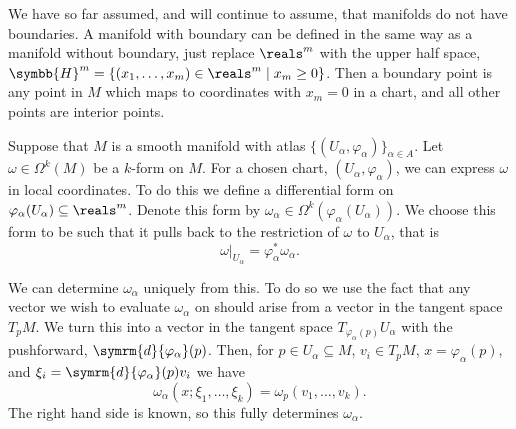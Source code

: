 \documentclass[fleqn]{NotesClass}
\renewcommand{\dl}{\symrm{d}}
\newcommand{\upperHalfSpace}{\symbb{H}}
\begin{document}
    \begin{remark}{}{}
        We have so far assumed, and will continue to assume, that manifolds do not have boundaries.
        A manifold with boundary can be defined in the same way as a manifold without boundary, just replace \(\reals^m\) with the upper half space, \(\upperHalfSpace^m = \{(x_1, \dotsc, x_m) \in \reals^m \mid x_m \ge 0\}\).
        Then a boundary point is any point in \(M\) which maps to coordinates with \(x_m = 0\) in a chart, and all other points are interior points.
    \end{remark}
    
    Suppose that \(M\) is a smooth manifold with atlas \(\{(U_\alpha, \varphi_\alpha)\}_{\alpha \in A}\).
    Let \(\omega \in \Omega^k(M)\) be a \(k\)-form on \(M\).
    For a chosen chart, \((U_\alpha, \varphi_\alpha)\), we can express \(\omega\) in local coordinates.
    To do this we define a differential form on \(\varphi_\alpha(U_\alpha) \subseteq \reals^m\).
    Denote this form by \(\omega_\alpha \in \Omega^k(\varphi_\alpha(U_\alpha))\).
    We choose this form to be such that it pulls back to the restriction of \(\omega\) to \(U_\alpha\), that is
    \begin{equation}
        \omega|_{U_\alpha} = \varphi_\alpha^*\omega_\alpha.
    \end{equation}
    
    We can determine \(\omega_\alpha\) uniquely from this.
    To do so we use the fact that any vector we wish to evaluate \(\omega_\alpha\) on should arise from a vector in the tangent space \(T_pM\).
    We turn this into a vector in the tangent space \(T_{\varphi_\alpha(p)}U_\alpha\) with the pushforward, \(\dl{\varphi_\alpha}(p)\).
    Then, for \(p \in U_\alpha \subseteq M\), \(v_i \in T_pM\), \(x = \varphi_\alpha(p)\), and \(\xi_i = \dl{\varphi_\alpha}(p)v_i\) we have
    \begin{equation}
        \omega_\alpha(x; \xi_1, \dotsc, \xi_k) = \omega_p(v_1, \dotsc, v_k).
    \end{equation}
    The right hand side is known, so this fully determines \(\omega_\alpha\).
    
\end{document}
